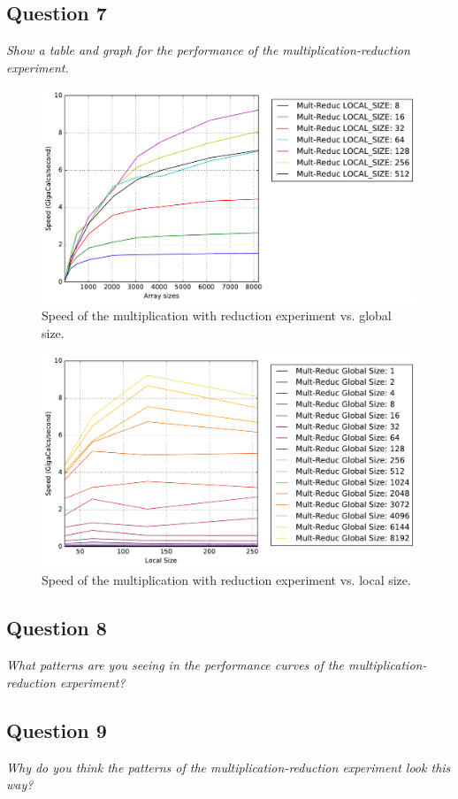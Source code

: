 \documentclass{article}
\begin{document}
\newpage
\subsection*{Question 7}
\textit{Show a table and graph for the performance of the multiplication-reduction experiment.}

\begin{figure}[h]
	\centering
        \includegraphics[width=0.7\linewidth]{Mult_Reduc_Arraysize_2.pdf}
        \caption{Speed of the multiplication with reduction experiment vs. global size.}
        \label{fig:ReducGlobal}
\end{figure}

\begin{figure}[h]
	\centering
        \includegraphics[width=0.7\linewidth]{Mult_Reduc_Localsize_2.pdf}
        \caption{Speed of the multiplication with reduction experiment vs. local size.}
        \label{fig:ReducLocal}
\end{figure}

\subsection*{Question 8}
\textit{What patterns are you seeing in the performance curves of the multiplication-reduction experiment?}



\subsection*{Question 9}
\textit{Why do you think the patterns of the multiplication-reduction experiment look this way?}
\end{document}
